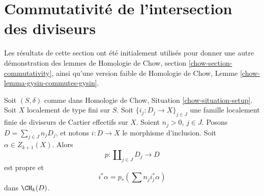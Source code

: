 \section{Commutativité de l'intersection des diviseurs}
\label{section-commutativity}

\noindent
Les résultats de cette section ont été initialement utilisés pour donner une autre
démonstration des lemmes de Homologie de Chow, section \ref{chow-section-commutativity},
ainsi qu'une version faible de
Homologie de Chow, Lemme \ref{chow-lemma-gysin-commutes-gysin}.

\begin{lemma}
\label{lemma-improved-additivity}
Soit $(S, \delta)$ comme dans Homologie de Chow, Situation \ref{chow-situation-setup}.
Soit $X$ localement de type fini sur $S$.
Soit $\{i_j : D_j \to X \}_{j \in J}$ une famille localement finie
de diviseurs de Cartier effectifs sur $X$. Soient $n_j > 0$, $j\in J$.
Posons $D = \sum_{j \in J} n_j D_j$, et notons $i : D \to X$ le
morphisme d'inclusion. Soit $\alpha \in Z_{k + 1}(X)$. Alors
$$
p : \coprod\nolimits_{j \in J} D_j \longrightarrow D
$$
est propre et
$$
i^*\alpha = p_*\left(\sum n_j i_j^*\alpha\right)
$$
dans $\CH_k(D)$.
\end{lemma}

